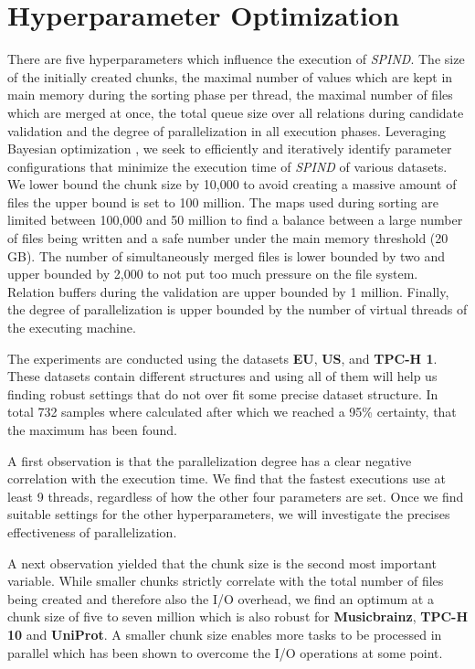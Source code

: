 \section{Hyperparameter Optimization}

There are five hyperparameters which influence the execution of \textit{SPIND}. The size of the initially created chunks, the maximal number of values which are kept in main memory during the sorting phase per thread, the maximal number of files which are merged at once, the total queue size over all relations during candidate validation and the degree of parallelization in all execution phases. Leveraging Bayesian optimization \cite{shahriari2015taking}, we seek to efficiently and iteratively identify parameter configurations that minimize the execution time of \textit{SPIND} of various datasets. We lower bound the chunk size by 10,000 to avoid creating a massive amount of files the upper bound is set to 100 million. The maps used during sorting are limited between 100,000 and 50 million to find a balance between a large number of files being written and a safe number under the main memory threshold (20 GB). The number of simultaneously merged files is lower bounded by two and upper bounded by 2,000 to not put too much pressure on the file system. Relation buffers during the validation are upper bounded by 1 million. Finally, the degree of parallelization is upper bounded by the number of virtual threads of the executing machine.

The experiments are conducted using the datasets \textbf{EU}, \textbf{US}, and \textbf{TPC-H 1}. These datasets contain different structures and using all of them will help us finding robust settings that do not over fit some precise dataset structure. In total 732 samples where calculated after which we reached a 95\% certainty, that the maximum has been found.

A first observation is that the parallelization degree has a clear negative correlation with the execution time. We find that the fastest executions use at least 9 threads, regardless of how the other four parameters are set. Once we find suitable settings for the other hyperparameters, we will investigate the precises effectiveness of parallelization.

A next observation yielded that the chunk size is the second most important variable. While smaller chunks strictly correlate with the total number of files being created and therefore also the I/O overhead, we find an optimum at a chunk size of five to seven million which is also robust for \textbf{Musicbrainz}, \textbf{TPC-H 10} and \textbf{UniProt}. A smaller chunk size enables more tasks to be processed in parallel which has been shown to overcome the I/O operations at some point.


